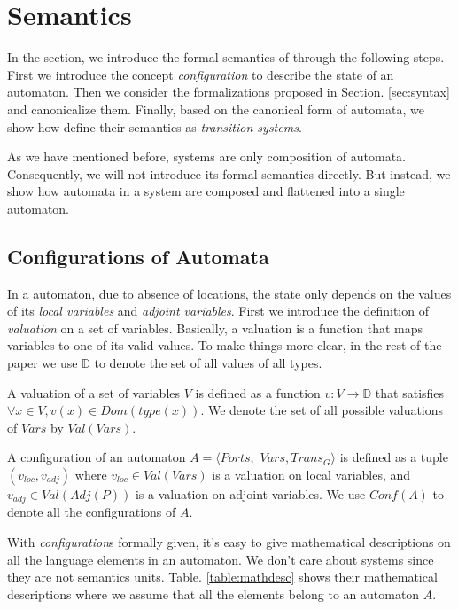 \section{Semantics}
\label{sec:semantics}

In the section, we introduce the formal semantics of \lang{} through the following steps. First we introduce the concept \emph{configuration} to describe the state of an automaton. Then we consider the formalizations proposed in Section. \ref{sec:syntax} and canonicalize them. Finally, based on the canonical form of automata, we show how define their semantics as \emph{transition systems}.

As we have mentioned before, systems are only composition of automata. Consequently, we will not introduce its formal semantics directly. But instead, we show how automata in a system are composed and flattened into a single automaton.


\subsection{Configurations of Automata}
\label{subsec:config}
In a \lang{} automaton, due to absence of locations, the state only depends on the values of its \emph{local variables} and \emph{adjoint variables}. First we introduce the definition of \emph{valuation} on a set of variables. Basically, a valuation is a function that maps variables to one of its valid values. To make things more clear, in the rest of the paper we use $\mathbb{D}$ to denote the set of all values of all types.

\begin{definition}[Valuation]
A valuation of a set of variables $V$ is defined as a function $v:V\rightarrow \mathbb{D}$ that satisfies $\forall x\in V,v(x)\in Dom(type(x))$. We denote the set of all possible valuations of $Vars$ by $Val(Vars)$.
\end{definition}

\begin{definition}[Configuration] A configuration of an automaton $A=\langle Ports,$ $Vars,Trans_G\rangle$ is defined as a tuple $(v_{loc},v_{adj})$ where $v_{loc}\in Val(Vars)$ is a valuation on local variables, and $v_{adj}\in Val(Adj(P))$ is a valuation on adjoint variables. We use $Conf(A)$ to denote all the configurations of $A$.
\end{definition}

With \emph{configuration}s formally given, it's easy to give mathematical descriptions on all the language elements in an automaton. We don't care about systems since they are not semantics units. Table. \ref{table:mathdesc} shows their mathematical descriptions where we assume that all the elements belong to an automaton $A$.

